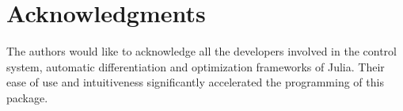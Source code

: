 \documentclass[5p,authoryear]{elsarticle}
\begin{document}




%
\section*{Acknowledgments}
The authors would like to acknowledge all the developers involved in the control system, automatic differentiation and optimization frameworks of Julia. Their ease of use and intuitiveness  significantly accelerated the programming of this package. 


\renewcommand{\bibfont}{\small}
 
\end{document}
